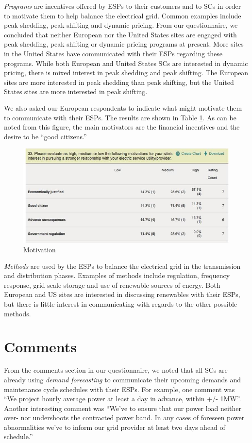 \documentclass{llncs}
\begin{document}
\emph{Programs} are incentives offered by ESPs to their customers and to SCs in order to motivate them to help balance the electrical grid. Common examples include peak shedding, peak shifting and dynamic pricing. From our questionnaire, we concluded that neither European nor the United States sites are engaged with peak shedding, peak shifting or dynamic pricing programs at present. More sites in the United States have communicated with their ESPs regarding these programs. While both European and United States SCs are interested in dynamic pricing, there is mixed interest in peak shedding and peak shifting. The European sites are more interested in peak shedding than peak shifting, but the United States sites are more interested in peak shifting. 

We also asked our European respondents to indicate what might motivate them to communicate with their ESPs. The results are shown in Table \ref{fig:table2}. As can be noted from this figure, the main motivators are the financial incentives and the desire to be ``good citizens.''

\begin{figure}
\begin{center}
\includegraphics[scale=0.5]{figs/Table2.jpg}
\caption{Motivation}
\label{fig:table2}
\end{center}
\end{figure}

\emph{Methods} are used by the ESPs to balance the electrical grid in the transmission and distribution phases. Examples of methods include regulation, frequency response, grid scale storage and use of renewable sources of energy. Both European and US sites are interested in discussing renewables with their ESPs, but there is little interest in communicating with regards to the other possible methods.

\section{Comments}
\label{comm}
From the comments section in our questionnaire, we noted that all SCs are already using \emph{demand forecasting} to communicate their upcoming demands and maintenance cycle schedules with their ESPs. For example, one comment was ``We project hourly average power at least a day in advance, within +/- 1MW''. Another interesting comment was ``We've to ensure that our power load neither over- nor undershoots the contracted power band. In any cases of foreseen power abnormalities we've to inform our grid provider at least two days ahead of schedule.''
\end{document}
